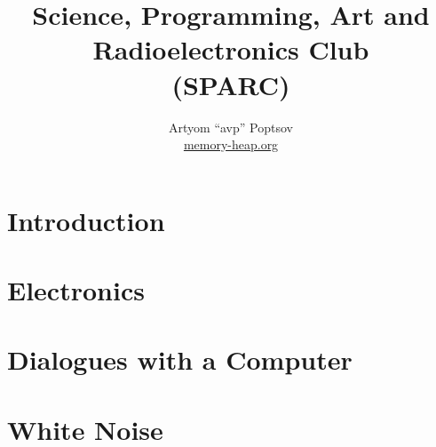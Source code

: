 \documentclass[a4paper,twoside]{book}
\title{Science, Programming, Art and Radioelectronics Club\\(SPARC)}
\author{Artyom ``avp'' Poptsov\\\href{https://memory-heap.org}{memory-heap.org}}
\begin{document}
\maketitle

\tableofcontents

\chapter*{Introduction}




\chapter{Electronics}
\label{chapter:electronics}








\chapter{Dialogues with a Computer}
\label{chapter:dialogues-with-computer}






\chapter{White Noise}
\label{chapter:white-noise}


\end{document}
